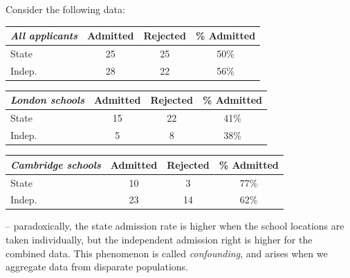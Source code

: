 \documentclass{../template/note}
\begin{document}
    \begin{example*}
        Consider the following data:
        \begin{center}
            \begin{tabular}{l | c c c}
                \emph{All applicants} & Admitted & Rejected & \% Admitted \\
                \hline
                State & 25 & 25 & 50\% \\
                Indep. & 28 & 22 & 56\%
            \end{tabular}
        \end{center}
        \begin{center}        
            \begin{tabular}{l | c c c}
                \emph{London schools} & Admitted & Rejected & \% Admitted \\
                \hline
                State & 15 & 22 & 41\% \\
                Indep. & 5 & 8 & 38\%
            \end{tabular}
        \end{center}
        \begin{center}    
            \begin{tabular}{l | c c c}
                \emph{Cambridge schools} & Admitted & Rejected & \% Admitted \\
                \hline
                State & 10 & 3 & 77\% \\
                Indep. & 23 & 14 & 62\%
            \end{tabular}
        \end{center}
        -- paradoxically, the state admission rate is higher when the school locations are taken individually, but the independent admission right is higher for the combined data. This phenomenon is called \emph{confounding}, and arises when we aggregate data from disparate populations.


\end{example*}
\end{document}
